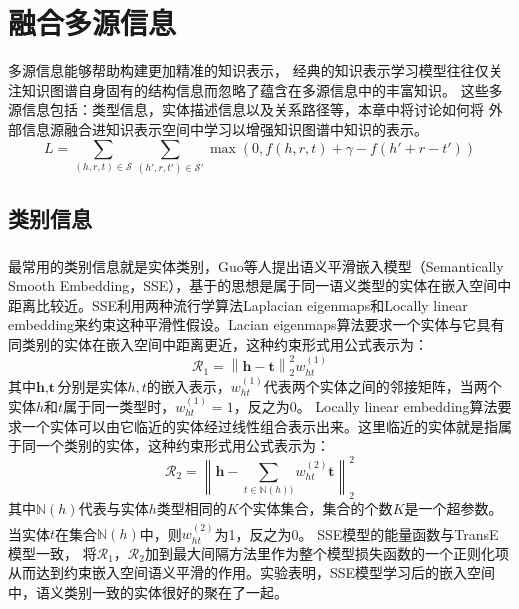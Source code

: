 \documentclass[twocolumn]{article}
\author{\zihao{-4} \songti xxx}
\date{}
\newcommand{\upcite}[1]{\textsuperscript{\textsuperscript{\cite{#1}}}}
\begin{document}
	\section{融合多源信息}
	多源信息能够帮助构建更加精准的知识表示，
	经典的知识表示学习模型往往仅关注知识图谱自身固有的结构信息而忽略了蕴含在多源信息中的丰富知识。
	这些多源信息包括：类型信息，实体描述信息以及关系路径等，本章中将讨论如何将
	外部信息源融合进知识表示空间中学习以增强知识图谱中知识的表示。
	\begin{equation}
		L=\sum_{(h,r,t)\in \mathcal{S}}\sum_{(h',r,t')\in \mathcal{S}'}\max (0,f(h,r,t)+\gamma-f(h'+r-t'))
	\end{equation}
	\subsection{类别信息}
	最常用的类别信息就是实体类别，Guo等人\upcite{SSE}提出语义平滑嵌入模型（Semantically Smooth Embedding，SSE），基于的思想是属于同一语义类型的实体在嵌入空间中距离比较近。SSE利用两种流行学算法Laplacian eigenmaps和Locally linear embedding来约束这种平滑性假设。Lacian eigenmaps算法要求一个实体与它具有同类别的实体在嵌入空间中距离更近，这种约束形式用公式表示为：
	\begin{equation}
		\mathcal{R}_1 =\left \| \textbf{h}-\textbf{t} \right \|_2^2w_{ht}^{(1)}
	\end{equation}
	其中$\textbf{h},\textbf{t}$分别是实体$h,t$的嵌入表示，$w_{ht}^{(1)}$代表两个实体之间的邻接矩阵，当两个实体$h$和$t$属于同一类型时，$w_{ht}^{(1)}=1$，反之为0。
	Locally linear embedding算法要求一个实体可以由它临近的实体经过线性组合表示出来。这里临近的实体就是指属于同一个类别的实体，这种约束形式用公式表示为：
	\begin{equation}
	\mathcal{R}_2=\left \| \textbf{h}-\sum _{t\in \mathbb{N}(h))}w_{ht}^{(2)}\textbf{t} \right \|_2^2
	\end{equation}
	其中$\mathbb{N}(h)$代表与实体$h$类型相同的$K$个实体集合，集合的个数$K$是一个超参数。
	当实体$t$在集合$\mathbb{N}(h)$中，则$w_{ht}^{(2)}$为1，反之为0。
	SSE模型的能量函数与TransE\upcite{TransE}模型一致，
	将$\mathcal{R}_1$，$\mathcal{R}_2$加到最大间隔方法里作为整个模型损失函数的一个正则化项从而达到约束嵌入空间语义平滑的作用。实验表明，SSE模型学习后的嵌入空间中，语义类别一致的实体很好的聚在了一起。
	
\end{document}
